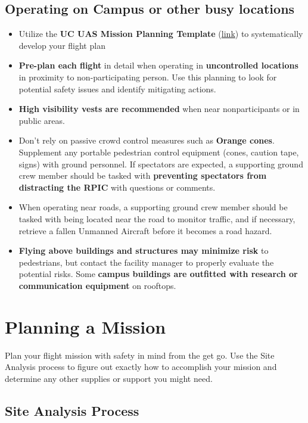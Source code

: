 \documentclass[
  12pt,
]{book}
\providecommand{\tightlist}{%
  \setlength{\itemsep}{0pt}\setlength{\parskip}{0pt}}
\begin{document}
\subsection{Operating on Campus or other busy locations}\label{operating-on-campus-or-other-busy-locations}

\begin{itemize}
\tightlist
\item
  Utilize the \textbf{UC UAS Mission Planning Template} (\href{http://ucdrones.github.io/library/mission_planning_template.docx}{link}) to systematically develop your flight plan
\item
  \textbf{Pre-plan each flight} in detail when operating in \textbf{uncontrolled locations} in proximity to non-participating person. Use this planning to look for potential safety issues and identify mitigating actions.
\item
  \textbf{High visibility vests are recommended} when near nonparticipants or in public areas.
\item
  Don't rely on passive crowd control measures such as \textbf{Orange cones}. Supplement any portable pedestrian control equipment (cones, caution tape, signs) with ground personnel. If spectators are expected, a supporting ground crew member should be tasked with \textbf{preventing spectators from distracting the RPIC} with questions or comments.
\item
  When operating near roads, a supporting ground crew member should be tasked with being located near the road to monitor traffic, and if necessary, retrieve a fallen Unmanned Aircraft before it becomes a road hazard.
\item
  \textbf{Flying above buildings and structures may minimize risk} to pedestrians, but contact the facility manager to properly evaluate the potential risks. Some \textbf{campus buildings are outfitted with research or communication equipment} on rooftops.
\end{itemize}

\section{Planning a Mission}\label{mission}

Plan your flight mission with safety in mind from the get go. Use the Site Analysis process to figure out exactly how to accomplish your mission and determine any other supplies or support you might need.

\subsection{Site Analysis Process}\label{site-analysis-process}
\end{document}
